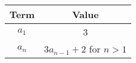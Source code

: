 
  \begin{tabular}{|c|c|}
    \hline
    \textbf{Term} & \textbf{Value} \\
    \hline
    $a_1$ & 3 \\
    \hline
    $a_n$ & $3a_{n-1} + 2$ for $n > 1$ \\
    \hline
  \end{tabular}


